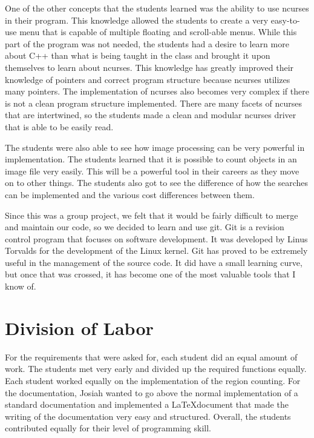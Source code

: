 \documentclass[pdftex, 11pt]{article}
\begin{document}
	One of the other concepts that the students learned was the ability to use ncurses in their program. This knowledge
allowed the students to create a very easy-to-use menu that is capable of multiple floating and scroll-able menus. While
this part of the program was not needed, the students had a desire to learn more about C++ than what is being taught in
the class and brought it upon themselves to learn about ncurses. This knowledge has greatly improved their knowledge of
pointers and correct program structure because ncurses utilizes many pointers. The implementation of ncurses also becomes
very complex if there is not a clean program structure implemented. There are many facets of ncurses that are
intertwined, so the students made a clean and modular ncurses driver that is able to be easily read.

The students were also able to see how image processing can be very powerful in implementation. The students learned
that it is possible to count objects in an image file very easily. This will be a powerful tool in their careers as they
move on to other things. The students also got to see the difference of how the searches can be implemented and the
various cost differences between them. 

	Since this was a group project, we felt that it would be fairly difficult to merge and maintain our code, so we decided
to learn and use git. Git is a revision control program that focuses on software development. It was developed by Linus
Torvalds for the development of the Linux kernel. Git has proved to be extremely useful in the management of the source
code. It did have a small learning curve, but once that was crossed, it has become one of the most valuable tools that I
know of.

\section{Division of Labor}

	For the requirements that were asked for, each student did an equal amount of work. The students met very early and
divided up the required functions equally. Each student worked equally on the implementation of the region counting. For the documentation,
Josiah wanted to go above the normal implementation of a standard documentation and implemented a \LaTeX document that
made the writing of the documentation very easy and structured. Overall, the students contributed equally for their
level of programming skill.
\end{document}
